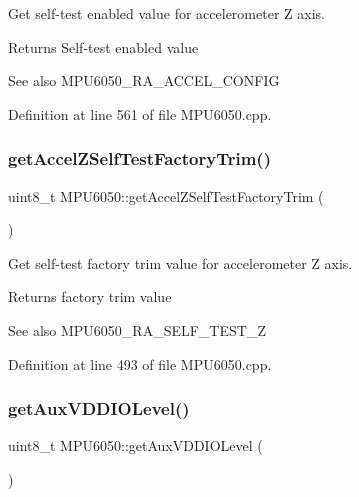 Get self-\/test enabled value for accelerometer Z axis. 

\begin{DoxyReturn}{Returns}
Self-\/test enabled value 
\end{DoxyReturn}
\begin{DoxySeeAlso}{See also}
M\+P\+U6050\+\_\+\+R\+A\+\_\+\+A\+C\+C\+E\+L\+\_\+\+C\+O\+N\+F\+IG 
\end{DoxySeeAlso}


Definition at line 561 of file M\+P\+U6050.\+cpp.

\mbox{\label{classMPU6050_a455f63be2ea810cac26d583da6915050}} 
\subsubsection{\texorpdfstring{getAccelZSelfTestFactoryTrim()}{getAccelZSelfTestFactoryTrim()}}
{\footnotesize\ttfamily uint8\+\_\+t M\+P\+U6050\+::get\+Accel\+Z\+Self\+Test\+Factory\+Trim (\begin{DoxyParamCaption}{ }\end{DoxyParamCaption})}



Get self-\/test factory trim value for accelerometer Z axis. 

\begin{DoxyReturn}{Returns}
factory trim value 
\end{DoxyReturn}
\begin{DoxySeeAlso}{See also}
M\+P\+U6050\+\_\+\+R\+A\+\_\+\+S\+E\+L\+F\+\_\+\+T\+E\+S\+T\+\_\+Z 
\end{DoxySeeAlso}


Definition at line 493 of file M\+P\+U6050.\+cpp.

\mbox{\label{classMPU6050_af6e9af8e2222889fd5458e2ae12c55c8}} 
\subsubsection{\texorpdfstring{getAuxVDDIOLevel()}{getAuxVDDIOLevel()}}
{\footnotesize\ttfamily uint8\+\_\+t M\+P\+U6050\+::get\+Aux\+V\+D\+D\+I\+O\+Level (\begin{DoxyParamCaption}{ }\end{DoxyParamCaption})}



